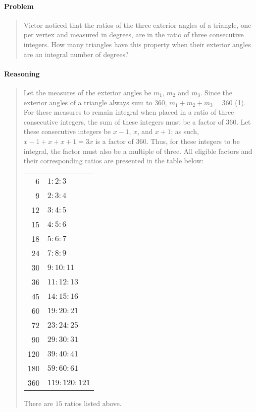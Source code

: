 \documentclass[letterpaper,12pt,twoside]{report}
\begin{document}
	\pagestyle{fancy}
	\fancyhf{}
	
	\paragraph{Problem}
	\begin{quote}
		\textsf{Victor noticed that the ratios of the
			three exterior angles of a triangle, one per
			vertex and measured in degrees, are in the
			ratio of three consecutive integers. How
			many triangles have this property when
			their exterior angles are an integral
			number of degrees?}
	\end{quote}
	
	\begin{center}
		\begin{tikzpicture}
		
		\end{tikzpicture}
	\end{center}
	
	\paragraph{Reasoning}
	\begin{quotation}
		
		Let the measures of the exterior angles be $m_1$, $m_2$ and $m_3$. Since the exterior angles of a triangle always sum to 360\textdegree, $m_1+m_2+m_3=360$ (1). For these measures to remain integral when placed in a ratio of three consecutive integers, the sum of these integers must be a factor of 360. Let these consecutive integers be $x-1$, $x$, and $x+1$; as such, $x-1+x+x+1=3x$ is a factor of 360. Thus, for these integers to be integral, the factor must also be a multiple of three. All eligible factors and their corresponding ratios are presented in the table below:
		
		\begin{center}
			\begin{tabular}{r | l}
				6 & $1:2:3$ \\
				9 & $2:3:4$ \\
				12 & $3:4:5$ \\
				15 & $4:5:6$ \\
				18 & $5:6:7$ \\
				24 & $7:8:9$ \\
				30 & $9:10:11$ \\
				36 & $11:12:13$ \\
				45 & $14:15:16$ \\
				60 & $19:20:21$ \\
				72 & $23:24:25$ \\
				90 & $29:30:31$ \\
				120 & $39:40:41$ \\
				180 & $59:60:61$ \\
				360 & $119:120:121$
			\end{tabular}
		\end{center}
		
		There are $\boxed{15}$ ratios listed above.
	\end{quotation}
	
\end{document}

